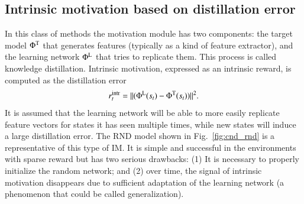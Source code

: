 \documentclass[a4paper,11pt]{elsarticle}
\newcommand{\IF}[1]{\textcolor{red}{#1}}
\begin{document}



\subsection{Intrinsic motivation based on distillation error}

In this class of methods the motivation module has two components: the target model $\Phi^{\rm T}$ that generates features (typically as a kind of feature extractor), and the learning network $\Phi^{\rm L}$ that tries to replicate them. This process is called knowledge distillation. Intrinsic motivation, expressed as an intrinsic reward, is computed as the distillation error
\begin{equation}
\label{eq:distill_error}
r_{t}^{\rm intr} = \| (\Phi^{\rm L}(s_t) - \Phi^{\rm T}(s_t)) \| ^{2}.
\end{equation}
It is assumed that the learning network will be able to more easily replicate feature vectors for states it has seen multiple times, while new states will induce a large distillation error.
The RND \citep{burda2018exploration} model shown in Fig.~\ref{fig:cnd_rnd} is a representative of this type of IM.
It is simple and successful in the environments with sparse reward but has two serious drawbacks: (1) It is necessary to properly initialize the random network; and (2) over time, the signal of intrinsic motivation disappears due to sufficient adaptation of the learning network (a phenomenon that could be called generalization).
\end{document}
